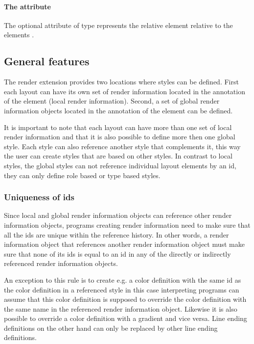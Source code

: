 \paragraph{The \fixttspace{} attribute}
The optional attribute  of type  represents the 
relative element relative to the elements \BoundingBox. 


\subsection{General features}

The render extension provides two locations where styles can be defined. First 
each layout can have its own set of render information located in the 
annotation of the \Layout element (local render information). 
Second, a set of global render information objects 
located in the annotation of the \ListOfLayouts element can be defined. 

It is important to note that each layout can have more than one 
set of local render information and that it is 
also possible to define more then one global style. Each style can also 
reference another style that complements it, this way the user can create 
styles that are based on other styles. In contrast to local styles, the global styles can not 
reference individual layout elements by an id, they can only define role based or 
type based styles.


\subsubsection{Uniqueness of ids}
Since local and global render information objects can reference other render information objects, programs creating
render information need to make sure that all the ids are unique within the reference history. In other words, a 
render information object that references another render information object must make sure that none of its ids is equal
to an id in any of the directly or indirectly referenced render information objects. 

An exception to this rule is to create e.g. a color definition with the same id as the color definition in a referenced style
in this case interpreting programs can assume that this color definition is supposed to override the color definition  with the
same name in the referenced render information object. Likewise it is also possible to override a color definition with a 
gradient and vice versa. Line ending definitions on the other hand can only be replaced by other line ending definitions.

